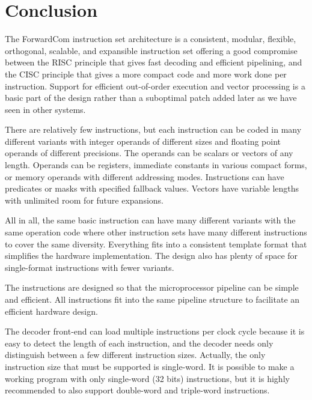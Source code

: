 \documentclass[forwardcom.tex]{subfiles}
\begin{document}
\RaggedRight

\chapter{Conclusion}
The ForwardCom instruction set architecture is a consistent, modular, 
flexible, orthogonal, scalable, and expansible instruction set offering a good compromise between the RISC principle that gives fast decoding and efficient pipelining, and the CISC principle that gives a more compact code and more work done per instruction. Support for efficient out-of-order execution and vector processing is a basic part of the design rather than a suboptimal patch added later as we have seen in other systems.
\vspace{2mm}

There are relatively few instructions, but each instruction can be coded in many different variants with integer operands of different sizes and floating point operands of different precisions. The operands can be scalars or vectors of any length. Operands can be registers, immediate constants in various compact forms, or memory operands with different addressing modes.  Instructions can have predicates or masks with specified fallback values. Vectors have variable lengths with unlimited room for future expansions.
\vspace{2mm}

All in all, the same basic instruction can have many different variants with the same operation code where other instruction sets have many different instructions to cover the same diversity. Everything fits into a consistent template format that simplifies the hardware implementation. The design also has plenty of space for single-format instructions with fewer variants. 
\vspace{2mm}

The instructions are designed so that the microprocessor pipeline can be simple and efficient. All instructions fit into the same pipeline structure to facilitate an efficient hardware design.
\vspace{2mm}

The decoder front-end can load multiple instructions per clock cycle because it is easy to detect the length of each instruction, and the decoder needs only distinguish between a few different instruction sizes. Actually, the only instruction size that must be supported is single-word. It is 
possible to make a working program with only single-word (32 bits) instructions, but it is highly recommended to also support double-word and triple-word instructions. \vspace{2mm}
\end{document}
